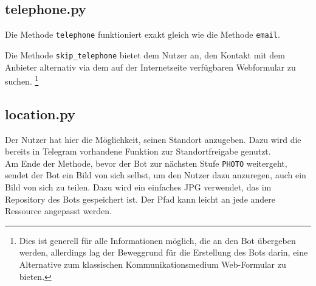            
        \subsection{telephone.py} \label{Implementierung: telephone.py}
                Die Methode \verb|telephone| funktioniert exakt gleich wie die Methode \verb|email|.

                Die Methode \verb|skip_telephone| bietet dem Nutzer an, den Kontakt mit dem Anbieter alternativ via dem auf der Internetseite verfügbaren Webformular zu suchen. \footnote{Dies ist generell für alle Informationen möglich, die an den Bot übergeben werden, allerdings lag der Beweggrund für die Erstellung des Bots darin, eine Alternative zum klassischen Kommunikationsmedium Web-Formular zu bieten.}
        
        
        \subsection{location.py} \label{Implementierung: location.py}
                Der Nutzer hat hier die Möglichkeit, seinen Standort anzugeben. Dazu wird die bereits in Telegram vorhandene Funktion zur Standortfreigabe genutzt. \\
                Am Ende der Methode, bevor der Bot zur nächsten Stufe \verb|PHOTO| weitergeht, sendet der Bot ein Bild von sich selbst, um den Nutzer dazu anzuregen, auch ein Bild von sich zu teilen. Dazu wird ein einfaches JPG verwendet, das im Repository des Bots gespeichert ist. Der Pfad kann leicht an jede andere Ressource angepasst werden.

        

